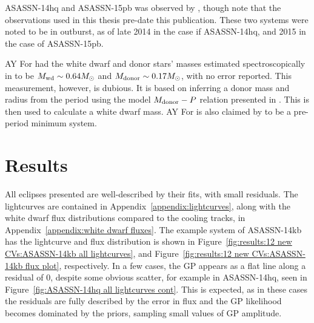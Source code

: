 ASASSN-14hq and ASASSN-15pb was observed by \citet{paterson2019}, though note that the observations used in this thesis pre-date this publication. These two systems were noted to be in outburst, as of late 2014 in the case if ASASSN-14hq, and 2015 in the case of ASASSN-15pb.

AY For had the white dwarf and donor stars' masses estimated spectroscopically in \citet{mason2005} to be $M_{\rm wd} \sim 0.64 M_\odot$ and $M_{\rm donor} \sim 0.17 M_\odot$, with no error reported. This measurement, however, is dubious. It is based on inferring a donor mass and radius from the period using the model $M_{\rm donor} - P$ relation presented in \citet{howell2002}. This is then used to calculate a white dwarf mass. AY For is also claimed by \citet{mason2005} to be a pre-period minimum system.


\section{Results}

All eclipses presented are well-described by their fits, with small residuals. The lightcurves are contained in Appendix~\ref{appendix:lightcurves}, along with the white dwarf flux distributions compared to the cooling tracks, in Appendix~\ref{appendix:white dwarf fluxes}. The example system of ASASSN-14kb has the lightcurve and flux distribution is shown in Figure~\ref{fig:results:12 new CVs:ASASSN-14kb all lightcurves}, and Figure~\ref{fig:results:12 new CVs:ASASSN-14kb flux plot}, respectively.
In a few cases, the GP appears as a flat line along a residual of 0, despite some obvious scatter, for example in ASASSN-14hq, seen in Figure~\ref{fig:ASASSN-14hq all lightcurves cont}. This is expected, as in these cases the residuals are fully described by the error in flux and the GP likelihood becomes dominated by the priors, sampling small values of GP amplitude.

